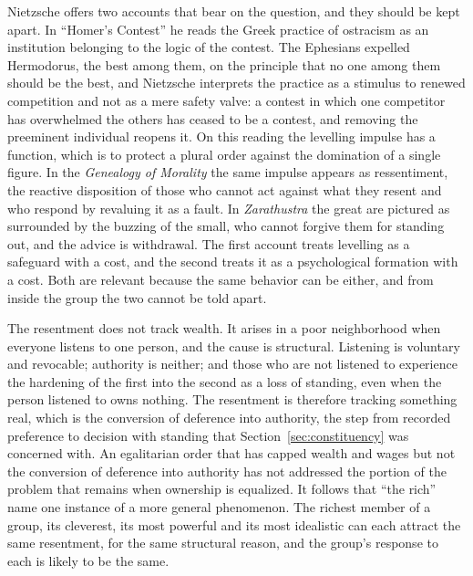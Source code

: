 \documentclass[12pt]{article}
\theoremstyle{definition}
\begin{document}
Nietzsche offers two accounts that bear on the question, and they should be kept apart. In ``Homer's Contest'' \cite{nietzsche1872} he reads the Greek practice of ostracism as an institution belonging to the logic of the contest. The Ephesians expelled Hermodorus, the best among them, on the principle that no one among them should be the best, and Nietzsche interprets the practice as a stimulus to renewed competition and not as a mere safety valve: a contest in which one competitor has overwhelmed the others has ceased to be a contest, and removing the preeminent individual reopens it. On this reading the levelling impulse has a function, which is to protect a plural order against the domination of a single figure. In the \emph{Genealogy of Morality} \cite{nietzsche1887} the same impulse appears as ressentiment, the reactive disposition of those who cannot act against what they resent and who respond by revaluing it as a fault. In \emph{Zarathustra} \cite{nietzsche1883} the great are pictured as surrounded by the buzzing of the small, who cannot forgive them for standing out, and the advice is withdrawal. The first account treats levelling as a safeguard with a cost, and the second treats it as a psychological formation with a cost. Both are relevant because the same behavior can be either, and from inside the group the two cannot be told apart.

The resentment does not track wealth. It arises in a poor neighborhood when everyone listens to one person, and the cause is structural. Listening is voluntary and revocable; authority is neither; and those who are not listened to experience the hardening of the first into the second as a loss of standing, even when the person listened to owns nothing. The resentment is therefore tracking something real, which is the conversion of deference into authority, the step from recorded preference to decision with standing that Section~\ref{sec:constituency} was concerned with. An egalitarian order that has capped wealth and wages but not the conversion of deference into authority has not addressed the portion of the problem that remains when ownership is equalized. It follows that ``the rich'' name one instance of a more general phenomenon. The richest member of a group, its cleverest, its most powerful and its most idealistic can each attract the same resentment, for the same structural reason, and the group's response to each is likely to be the same.
\end{document}
